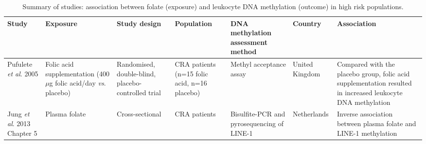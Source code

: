 \documentclass[10pt, letterpaper, twoside]{book} %
\begin{document}
\begin{sidewaystable}
\small
\caption{Summary of studies: association between folate (exposure) and leukocyte DNA methylation (outcome) in high risk populations.} 
\label{table7_6}
\renewcommand{\arraystretch}{1}
\begin{tabular}{L{2cm}C{2cm}C{2cm}C{2cm}C{2.5cm}C{1.5cm}C{3cm}} 
\hline\bfseries Study & \bfseries Exposure & \bfseries Study design & \bfseries Population & \bfseries DNA methylation assessment 
method & \bfseries Country & \bfseries Association\\
\hline

\parbox[t][3.6cm]{2cm}{\raggedright Pufulete \textit{et al}. 2005 \cite{c713}} &
\parbox[t][3.6cm]{2cm}{\centering Folic acid supplementation (400 $\mu$g folic acid/day \textit{vs}. placebo)} &
\parbox[t][3.6cm]{2cm}{\centering Randomised, double-blind, placebo-controlled trial} &
\parbox[t][3.6cm]{2cm}{ CRA patients (n=15 folic acid, n=16 placebo)} &
\parbox[t][3.6cm]{2.5cm}{\centering Methyl acceptance assay} &
\parbox[t][3.6cm]{1.5cm}{\centering United Kingdom} &
\parbox[t][3.6cm]{3cm}{\centering Compared with the placebo group, folic acid supplementation resulted in increased leukocyte DNA methylation}\\

\parbox[t][2.1cm]{2cm}{\raggedright Jung \emph{et al}. 2013 \cite{c714} Chapter 5} &
\parbox[t][2.1cm]{2cm}{\centering Plasma folate} &
\parbox[t][2.1cm]{2cm}{\centering Cross-sectional} &
\parbox[t][2.1cm]{2cm}{ CRA patients} &
\parbox[t][2.1cm]{2.5cm}{\centering Bisulfite-PCR and pyrosequencing of LINE-1} &
\parbox[t][2.1cm]{1.5cm}{\centering Netherlands} &
\parbox[t][2.1cm]{3cm}{\centering Inverse association between plasma folate and LINE-1 methylation}\\
\hline
\end{tabular}
\end{sidewaystable} 
\end{document}

